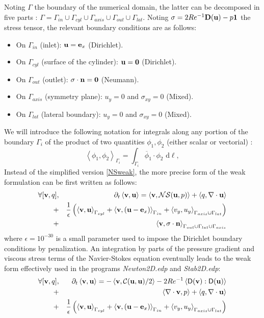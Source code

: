 \documentclass[twocolumn,10pt]{asme2ej}
\begin{document}
Noting $\Gamma$ the boundary of the numerical domain, the latter can be decomposed in five parts : 
$\Gamma = \Gamma_{in} \cup \Gamma_{cyl} \cup \Gamma_{axis} \cup \Gamma_{out} \cup \Gamma_{lat}$. 
Noting $\sigma = 2 Re^{-1} {\bf D}({\bf u}) - p {\bf 1}$ the stress tensor, the relevant boundary conditions are as follows:
\begin{itemize}
\item On $\Gamma_{in}$ (inlet): ${\bf u} = {\bf e}_x$ (Dirichlet).
\item On $\Gamma_{cyl}$ (surface of the cylinder): ${\bf u} = {\bf 0}$ (Dirichlet).
\item On $\Gamma_{out}$ (outlet): $\sigma \cdot {\bf n} = {\bf 0}$ (Neumann). 
\item On $\Gamma_{axis}$ (symmetry plane): $u_y = 0$ and $\sigma_{xy} = 0$ (Mixed). 
\item On $\Gamma_{lat}$ (lateral boundary): $u_y = 0$ and $\sigma_{xy} = 0$ (Mixed). 
\end{itemize}
We will introduce the following notation for integrals along any portion of the boundary $\Gamma_i$ of the product of two quantities $\phi_1, \phi_2$ (either scalar or vectorial) :
$$
\left< \phi_1, \phi_2 \right>_{\Gamma_i} = \int_{\Gamma_i}  \overline{\phi}_1 \cdot \phi_2   \mbox{ d} \ell,
$$
Instead of the simplified version \ref{NSweak}, the more precise form of the weak formulation can be first written as follows:
\begin{eqnarray}
\label{NSweakFull}
\forall [{\bf v},q], &&\quad \partial_t \left< {\bf v}, {\bf u}\right> = \left< {\bf v} , {\cal NS} ({\bf u},p) \right> + \left< q, \nabla \cdot {\bf u}\right>\\
+ &&\frac{1}{\epsilon} \left(  \left< {\bf v}, \bf{u} \right>_{\Gamma_{cyl}} + \left< {\bf v}, ({\bf u}- {\bf e}_x ) \right>_{\Gamma_{in}} 
+ \left< v_y, u_y\right>_{\Gamma_{axis}\cup \Gamma_{lat}} \right) \nonumber \\
+ && \left< {\bf v}, \sigma \cdot {\bf n} \right>_{\Gamma_{out} \cup  \Gamma_{lat} \cup \Gamma_{axis} }  \nonumber 
\end{eqnarray}
where $\epsilon=10^{-30}$ is a small parameter used to impose the Dirichlet boundary conditions by penalization.
An integration by parts of the pressure gradient and viscous stress terms of the Navier-Stokes equation eventually 
leads to the weak form effectively used in the programs {\em Newton2D.edp} and {\em Stab2D.edp}:
\begin{eqnarray}
\forall [{\bf v},q], &&\, \partial_t \left< {\bf v}, {\bf u}\right> = - \left< {\bf v} , {\cal C}({\bf u},{\bf u})/2 \right>
- 2 Re^{-1} \left< {\mathsf D}({\bf v}) : {\mathsf D}({\bf u})  \right>  \nonumber \\
+ &&\left< \nabla \cdot {\bf v}, p \right> + \left< q, \nabla \cdot {\bf u} \right> \label{NSweakFullN} \\
+ &&\frac{1}{\epsilon} \left(  \left< {\bf v}, \bf{u} \right>_{\Gamma_{cyl}} + \left< {\bf v}, ({\bf u}- {\bf e}_x ) \right>_{\Gamma_{in}} 
+ \left< v_y, u_y\right>_{\Gamma_{axis}\cup \Gamma_{lat}} \right) \nonumber 
\end{eqnarray}
\end{document}
